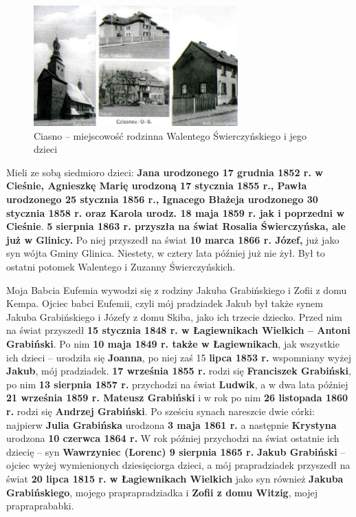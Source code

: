 \begin{figure}[!h]
\begin{center}
\includegraphics[width=0.7\textwidth]{photo/ciasno.jpg}
\caption[Ciasno]{Ciasno -- miejscowość rodzinna Walentego Świerczyńskiego i jego dzieci}
\end{center}
\end{figure}

Mieli ze sobą siedmioro dzieci: \textbf{Jana urodzonego 17 grudnia 1852 r. w Cieśnie, Agnieszkę Marię urodzoną 17 stycznia 1855 r., Pawła urodzonego 25 stycznia 1856 r., Ignacego Błażeja urodzonego 30 stycznia 1858 r. oraz Karola urodz. 18 maja 1859 r. jak i poprzedni w Cieśnie}. \textbf{5 sierpnia 1863 r. przyszła na świat Rosalia Świerczyńska, ale  już w Glinicy.} Po niej przyszedł na świat \textbf{10 marca 1866 r. Józef,} już jako syn wójta Gminy Glinica. Niestety, w cztery lata później już nie żył. Był to ostatni potomek Walentego i Zuzanny Świerczyńskich.

Moja Babcia Eufemia wywodzi się z rodziny Jakuba Grabińskiego i Zofii z domu Kempa. Ojciec babci Eufemii, czyli mój pradziadek Jakub był także synem Jakuba Grabińskiego i Józefy z domu Skiba, jako ich trzecie dziecko. Przed nim na świat przyszedł \textbf{15 stycznia 1848 r. w Łagiewnikach Wielkich – Antoni Grabiński}. Po nim \textbf{10 maja 1849 r. także w Łagiewnikach}, jak wszystkie ich dzieci – urodziła się \textbf{Joanna}, po niej zaś 15 \textbf{lipca 1853 r.} wspomniany wyżej \textbf{Jakub}, mój pradziadek. \textbf{17 września 1855 r.} rodzi się \textbf{Franciszek Grabiński}, po nim \textbf{13 sierpnia 1857 r.} przychodzi na świat \textbf{Ludwik}, a w dwa lata później \textbf{21 września 1859 r. Mateusz Grabiński} i w rok po nim \textbf{26 listopada 1860 r.} rodzi się \textbf{Andrzej Grabiński}. Po sześciu synach nareszcie dwie córki: najpierw \textbf{Julia Grabińska} urodzona \textbf{3 maja 1861 r.} a następnie \textbf{Krystyna} 	urodzona \textbf{10 czerwca 1864 r.} W rok później przychodzi na świat ostatnie ich dziecię – syn \textbf{Wawrzyniec (Lorenc) 9 sierpnia 1865 r.} \textbf{Jakub Grabiński} – ojciec wyżej wymienionych dziesięciorga dzieci, a mój prapradziadek przyszedł na świat \textbf{20 lipca 1815 r. w Łagiewnikach Wielkich} jako syn również \textbf{Jakuba Grabińskiego}, mojego praprapradziadka i \textbf{Zofii z domu Witzig}, mojej prapraprababki.

